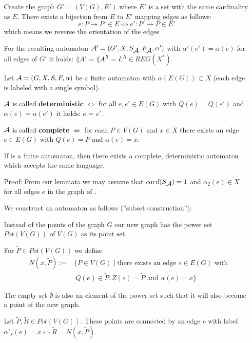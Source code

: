 Create the graph $G' = (V(G), E')$ where $E'$ is a set with the same cardinality
as $E$. There exists a bijection from $E$ to $E'$ mapping edges as follows:
\[ e : P \to P' \in E \Leftrightarrow e' : P' \to P \in E' \]
which means we reverse the orientation of the edges.

For the resulting automaton $\mbox{$\mathcal{A'}$} = (G', X, S_{\mbox{$\mathcal{A}$}},
F_{\mbox{$\mathcal{A}$}}, \alpha')$ with $\alpha'(e') = \alpha(e)$ for all edges of $G'$
it holds: $\lang{A'} = \lang{A}^R = L^R \in REG(X^*)$.

\begin{definition}
Let $\mbox{$\mathcal{A}$} = (G, X, S, F, \alpha)$ be a finite automaton with
$\alpha(E(G)) \subset X$ (each edge is labeled with a single
symbol).

$\mbox{$\mathcal{A}$}$ is called {\bf deterministic} $\Leftrightarrow$ for all $e, e'
\in E(G)$ with $Q(e) = Q(e')$ and $\alpha(e) = \alpha(e')$ it holds: $e$ = $e'$.

$\mbox{$\mathcal{A}$}$ is called {\bf complete} $\Leftrightarrow$ for each $P \in V(G)$
and $x \in X$ there exists an edge $e \in E(G)$ with $Q(e) = P$ and $\alpha(e)
= x$.
\end{definition}

\begin{theorem}
If  is a finite automaton, then there exists a complete,
deterministic automaton  which accepts the same language.
\end{theorem}

Proof: From our lemmata we may assume that $card(S_{\mbox{$\mathcal{A}$}}) = 1$ and
$\alpha_2(e) \in X$ for all edges $e$ in the graph of .

We construct an automaton  as follows (''subset construction''):

Instead of the points of the graph $G$ our new graph has the power set
$Pot(V(G))$ of $V(G)$ as its point set.

For $\tilde{P} \in Pot(V(G))$ we define 
\begin{eqnarray*}
& N(x, \tilde{P}) := & \{ P \in V(G) \mid \mbox{there exists an edge } e \in
E(G) \mbox{ with } \\
& & \ Q(e) \in \tilde{P}, Z(e) = \tilde{P} \mbox{ and } \alpha(e) = x \} 
\end{eqnarray*}

The empty set $\emptyset$ is also an element of the power set such that it will
also become a point of the new graph.

Let $\tilde{P}, \tilde{R} \in Pot(V(G))$. These points are connected by an edge
$e$ with label $\alpha'_s(e) = x \Leftrightarrow \tilde{R} = N(x, \tilde{P})$.

